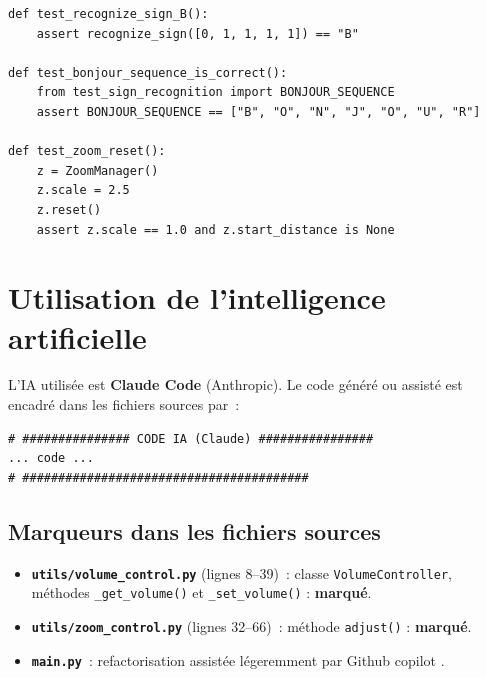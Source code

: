 \documentclass[12pt,a4paper]{article}
\begin{document}
\begin{lstlisting}[caption={Exemples de tests unitaires.}]
def test_recognize_sign_B():
    assert recognize_sign([0, 1, 1, 1, 1]) == "B"

def test_bonjour_sequence_is_correct():
    from test_sign_recognition import BONJOUR_SEQUENCE
    assert BONJOUR_SEQUENCE == ["B", "O", "N", "J", "O", "U", "R"]

def test_zoom_reset():
    z = ZoomManager()
    z.scale = 2.5
    z.reset()
    assert z.scale == 1.0 and z.start_distance is None
\end{lstlisting}

\newpage

\section{Utilisation de l'intelligence artificielle}
\label{sec:ia}

L'IA utilis\'ee est \textbf{Claude Code} (Anthropic). Le code g\'en\'er\'e ou assist\'e
est encadr\'e dans les fichiers sources par~:

\begin{lstlisting}[numbers=none]
# ############### CODE IA (Claude) ################
... code ...
# ########################################
\end{lstlisting}

\subsection{Marqueurs dans les fichiers sources}

\begin{iabox}
\begin{itemize}
  \item \textbf{\texttt{utils/volume\_control.py}} (lignes 8--39)~: classe \texttt{VolumeController},
        m\'ethodes \texttt{\_get\_volume()} et \texttt{\_set\_volume()} : \textbf{marqu\'e}.
  \item \textbf{\texttt{utils/zoom\_control.py}} (lignes 32--66)~: m\'ethode \texttt{adjust()} :
        \textbf{marqu\'e}.
  
 
  \item \textbf{\texttt{main.py}}~: refactorisation assist\'ee légeremment par Github copilot .
\end{itemize}
\end{iabox}
\end{document}
